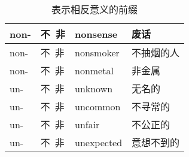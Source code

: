 \documentclass[UTF8]{ctexart}
\begin{document}
\begin{table}[h!]
\begin{center}
\begin{tabular}{p{40pt}|p{80pt}|p{100pt}|p{100pt}}
                non-&不~非&nonsense&废话\\ \hline
                non-&不~非&nonsmoker&不抽烟的人\\ \hline
                non-&不~非&nonmetal&非金属\\ \hline
                un-&不~非&unknown&无名的\\ \hline
                un-&不~非&uncommon&不寻常的\\ \hline
                un-&不~非&unfair&不公正的\\ \hline
                un-&不~非&unexpected&意想不到的\\ \hline
            \end{tabular}
            \rmfamily
            \caption{表示相反意义的前缀}
        \end{center}
    \end{table}\\

\newpage
\end{document}
